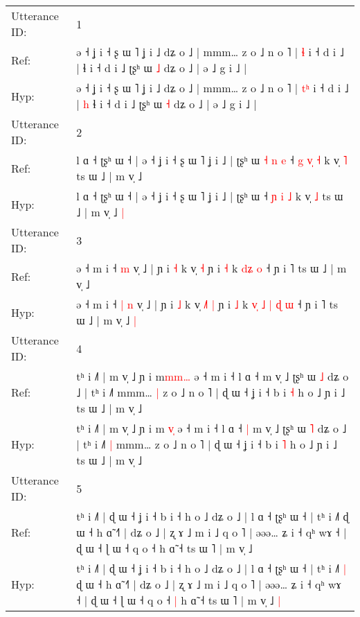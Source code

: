 \documentclass[10pt]{article}
\DeclareRobustCommand{\hl}[1]{{\textcolor{red}{#1}}}
\begin{document}
\begin{longtable}{ll}
\toprule
Utterance ID: & 1 \\
Ref: & ə ˧ ʝ i ˧ ʂ ɯ ˥ ʝ i ˩ dʑ o ˩ | mmm… z o ˩ n o ˥ | \hl{}\hl{ɬ} i ˧ d i ˩ |\hl{}\hl{} ɬ i ˧ d i ˩ ʈʂʰ ɯ \hl{˩} dʑ o ˩ | ə ˩ g i ˩ |
 \\
Hyp: & ə ˧ ʝ i ˧ ʂ ɯ ˥ ʝ i ˩ dʑ o ˩ | mmm… z o ˩ n o ˥ | \hl{t}\hl{ʰ} i ˧ d i ˩ |\hl{ }\hl{h} ɬ i ˧ d i ˩ ʈʂʰ ɯ \hl{˧} dʑ o ˩ | ə ˩ g i ˩ |
 \\
\midrule
Utterance ID: & 2 \\
Ref: & l ɑ ˧ ʈʂʰ ɯ ˧ | ə ˧ ʝ i ˧ ʂ ɯ ˥ ʝ i ˩ | ʈʂʰ ɯ\hl{ }\hl{˧}\hl{ }\hl{n}\hl{ }\hl{e} ˧ \hl{g} \hl{v}\hl{̩} \hl{˧} k v̩ \hl{˥} ts ɯ ˩ | m v̩ ˩\hl{}\hl{}
 \\
Hyp: & l ɑ ˧ ʈʂʰ ɯ ˧ | ə ˧ ʝ i ˧ ʂ ɯ ˥ ʝ i ˩ | ʈʂʰ ɯ\hl{}\hl{}\hl{}\hl{}\hl{}\hl{} ˧ \hl{ɲ} \hl{}\hl{i} \hl{˩} k v̩ \hl{˩} ts ɯ ˩ | m v̩ ˩\hl{ }\hl{|}
 \\
\midrule
Utterance ID: & 3 \\
Ref: & ə ˧ m i ˧\hl{}\hl{} \hl{m} v̩ ˩ | ɲ i \hl{˧} k v̩\hl{}\hl{}\hl{} \hl{˧} ɲ i \hl{˧} k\hl{}\hl{}\hl{}\hl{}\hl{} \hl{}\hl{d}\hl{ʑ} \hl{o} ˧ ɲ i ˥ ts ɯ ˩ | m v̩ ˩\hl{}\hl{}
 \\
Hyp: & ə ˧ m i ˧\hl{ }\hl{|} \hl{n} v̩ ˩ | ɲ i \hl{˩} k v̩\hl{ }\hl{˩}\hl{˥} \hl{|} ɲ i \hl{˩} k\hl{ }\hl{v}\hl{̩}\hl{ }\hl{˩} \hl{|}\hl{ }\hl{ɖ} \hl{ɯ} ˧ ɲ i ˥ ts ɯ ˩ | m v̩ ˩\hl{ }\hl{|}
 \\
\midrule
Utterance ID: & 4 \\
Ref: & tʰ i ˩˥ | m v̩ ˩ ɲ i m\hl{m}\hl{m}\hl{…} ə ˧ m i ˧ l ɑ ˧\hl{}\hl{} m v̩ ˩ ʈʂʰ ɯ \hl{˩} dʑ o ˩ | tʰ i ˩˥\hl{}\hl{} mmm…\hl{ }\hl{|} z o ˩ n o ˥ | ɖ ɯ ˧ ʝ i ˧ b i \hl{˧} h o ˩ ɲ i ˩ ts ɯ ˩ | m v̩ ˩
 \\
Hyp: & tʰ i ˩˥ | m v̩ ˩ ɲ i m\hl{ }\hl{v}\hl{̩} ə ˧ m i ˧ l ɑ ˧\hl{ }\hl{|} m v̩ ˩ ʈʂʰ ɯ \hl{˥} dʑ o ˩ | tʰ i ˩˥\hl{ }\hl{|} mmm…\hl{}\hl{} z o ˩ n o ˥ | ɖ ɯ ˧ ʝ i ˧ b i \hl{˥} h o ˩ ɲ i ˩ ts ɯ ˩ | m v̩ ˩
 \\
\midrule
Utterance ID: & 5 \\
Ref: & tʰ i ˩˥ | ɖ ɯ ˧ ʝ i ˧ b i ˧ h o ˩ dʑ o ˩ | l ɑ ˧ ʈʂʰ ɯ ˧ | tʰ i ˩˥\hl{}\hl{} ɖ ɯ ˧ h ɑ̃ ˧˥ | dʑ o ˩ | ʐ ɤ ˩ m i ˩ q o ˥ | əəə… ʑ i ˧ qʰ wɤ ˧ | ɖ ɯ ˧ ɭ ɯ ˧ q o ˧\hl{}\hl{} h ɑ̃ ˧ ts ɯ ˥ | m v̩ ˩\hl{}\hl{}
 \\
Hyp: & tʰ i ˩˥ | ɖ ɯ ˧ ʝ i ˧ b i ˧ h o ˩ dʑ o ˩ | l ɑ ˧ ʈʂʰ ɯ ˧ | tʰ i ˩˥\hl{ }\hl{|} ɖ ɯ ˧ h ɑ̃ ˧˥ | dʑ o ˩ | ʐ ɤ ˩ m i ˩ q o ˥ | əəə… ʑ i ˧ qʰ wɤ ˧ | ɖ ɯ ˧ ɭ ɯ ˧ q o ˧\hl{ }\hl{|} h ɑ̃ ˧ ts ɯ ˥ | m v̩ ˩\hl{ }\hl{|}
 \\

\end{longtable}
\end{document}
